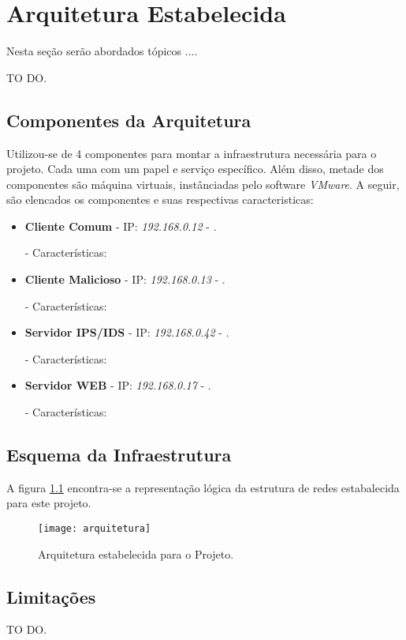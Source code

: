 \chapter{Arquitetura Estabelecida}
\label{chap:Arquitetura}
	
	Nesta seção serão abordados tópicos ....

	TO DO.

	\section{Componentes da Arquitetura}
	\label{sec:Arquitetura_Componentes}

		Utilizou-se de 4 componentes para montar a infraestrutura necessária para o projeto. Cada uma com um papel e serviço específico. Além disso, metade dos componentes são máquina virtuais, instânciadas pelo software \emph{VMware}. A seguir, são elencados os componentes e suas respectivas caracteristicas:

		\begin{itemize}
			\item \textbf{Cliente Comum} - IP: \emph{192.168.0.12} - .

			- Características:
	
			\item \textbf{Cliente Malicioso} - IP: \emph{192.168.0.13} - .

			- Características:
	
			\item \textbf{Servidor IPS/IDS} - IP: \emph{192.168.0.42} - .

			- Características:
	
			\item \textbf{Servidor WEB} - IP: \emph{192.168.0.17} - .	

			- Características:
	
		\end{itemize}


	\section{Esquema da Infraestrutura}
	\label{sec:Arquitetura_Esquema_Infra}

		A figura \ref{fig:arquitetura} encontra-se a representação lógica da estrutura de redes estabalecida para este projeto.

		\begin{figure}[h]
			\centering
			\texttt{[image: arquitetura]}
			\caption{Arquitetura estabelecida para o Projeto.}
			\label{fig:arquitetura}
		\end{figure}

	\section{Limitações}
	\label{sec:Arquitetura_Limitacoes}

		TO DO.

		
